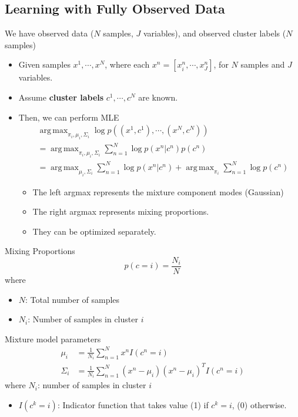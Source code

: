 \documentclass[10pt]{article}
\DeclareMathOperator*{\argmax}{arg\,max}
\begin{document}
\subsection*{Learning with Fully Observed Data}
We have observed data ($N$ samples, $J$ variables), and observed cluster labels ($N$ samples)
\begin{itemize}
	\item Given samples $x^1, \cdots, x^N$, where each $x^n = [x_i^n, \cdots, x_J^n]$, for $N$ samples and $J$ variables.
	\item Assume \textbf{cluster labels} $c^1, \cdots, c^N$ are known.
	\item Then, we can perform MLE
	\begin{align*}
        &\argmax_{\pi_i, \mu_i, \Sigma_i} \log p\left((x^1, c^1), \cdots, (x^N, c^N)\right) \\
        &= \argmax_{\pi_i, \mu_i, \Sigma_i} \sum_{n = 1}^N \log p(x^n | c^n) p(c^n) \\
        &= \argmax_{\mu_i, \Sigma_i} \sum_{n = 1}^N \log p(x^n | c^n) + \argmax_{\pi_i} \sum_{n = 1}^N \log p(c^n)
    \end{align*}
    \begin{itemize}
	    \item The left argmax represents the mixture component modes (Gaussian)
	    \item The right argmax represents mixing proportions.  
	    \item They can be optimized separately.
    \end{itemize}
\end{itemize}
Mixing Proportions
\[p(c = i) = \frac{N_i}{N}\]
where 
\begin{itemize}
	\item $N$: Total number of samples
	\item $N_i$: Number of samples in cluster $i$
\end{itemize}
Mixture model parameters
\begin{align*}
    \mu_i &= \frac{1}{N_i} \sum_{n = 1}^N x^n I(c^n = i) \\
    \Sigma_i &= \frac{1}{N_i} \sum_{n = 1}^N (x^n - \mu_i)(x^n - \mu_i)^T I(c^n = i)
\end{align*}
where $N_i$: number of samples in cluster $i$
\begin{itemize}
	\item $I(c^k = i)$: Indicator function that takes value (1) if $c^k = i$, (0) otherwise.
\end{itemize}
\end{document}
